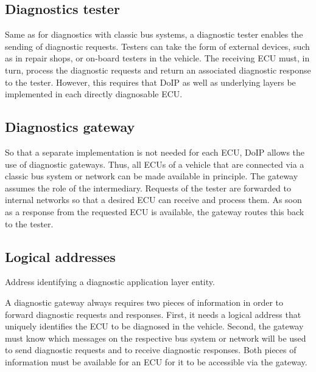 \subsection{Diagnostics tester} 
Same as for diagnostics with classic bus systems, a diagnostic tester enables the sending of 
diagnostic requests. Testers can take the form of external devices, such as in repair shops, or on-board testers in 
the vehicle. The receiving ECU must, in turn, process the diagnostic requests and return an associated diagnostic 
response to the tester. However, this requires that DoIP as well as underlying layers be implemented in each directly 
diagnosable ECU.

\subsection{Diagnostics gateway}
So that a separate implementation is not needed for each ECU, DoIP allows the use of diagnostic 
gateways. Thus, all ECUs of a vehicle that are connected via a classic bus system or network can be made available in 
principle. The gateway assumes the role of the intermediary. Requests of the tester are forwarded to internal networks 
so that a desired ECU can receive and process them. As soon as a response from the requested ECU is available, the gateway 
routes this back to the tester.

\subsection{Logical addresses} 
Address identifying a diagnostic application layer entity.

A diagnostic gateway always requires two pieces of information in order to forward diagnostic requests
and responses. First, it needs a logical address that uniquely identifies the ECU to be diagnosed in the vehicle. Second, 
the gateway must know which messages on the respective bus system or network will be used to send diagnostic requests and 
to receive diagnostic responses. Both pieces of information must be available for an ECU for it to be accessible via the gateway.
